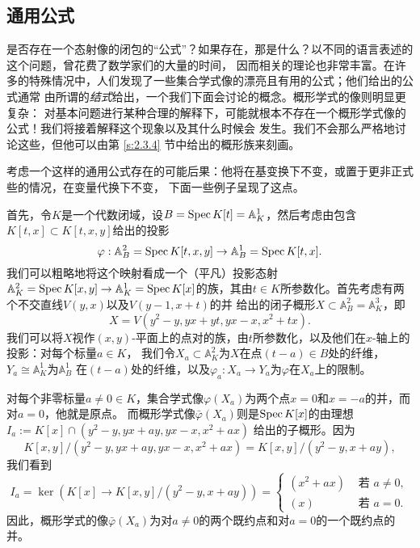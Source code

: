 \subsection{通用公式}\label{s:5.1.2}

是否存在一个态射像的闭包的“公式”？如果存在，那是什么？以不同的语言表述的这个问题，曾花费了数学家们的大量的时间，
因而相关的理论也非常丰富。在许多的特殊情况中，人们发现了一些集合学式像的漂亮且有用的公式；他们给出的公式通常
由所谓的\textit{结式}给出，一个我们下面会讨论的概念。概形学式的像则明显更复杂：
对基本问题进行某种合理的解释下，可能就根本不存在一个概形学式像的公式！我们将接着解释这个现象以及其什么时候会
发生。我们不会那么严格地讨论这些，但他可以由第 \ref{s:2.3.4} 节中给出的概形族来刻画。

考虑一个这样的通用公式存在的可能后果：他将在基变换下不变，或置于更非正式些的情况，在变量代换下不变，
下面一些例子呈现了这点。

\begin{exa}\label{exa:5.6}
    首先，令$K$是一个代数闭域，设$B=\operatorname{Spec} K[t]=\mathbb A_K^1$，然后考虑由包含$K[t,x]\subset K[t,x,y]$给出的投影
    \[
        \varphi: \mathbb{A}_B^2=\operatorname{Spec} K[t, x, y] \rightarrow \mathbb{A}_B^1=\operatorname{Spec} K[t, x].
    \]
    我们可以粗略地将这个映射看成一个（平凡）投影态射$\mathbb{A}_K^2=\operatorname{Spec} K[x, y] \rightarrow 
    \mathbb{A}_K^1=\operatorname{Spec} K[x]$的族，其由$t\in K$所参数化。首先考虑有两个不交直线$V(y,x)$以及$V(y-1,x+t)$的并
    给出的闭子概形$X \subset \mathbb{A}_B^2=\mathbb{A}_K^3$，即
    \[
        X=V\left(y^2-y, y x+y t, y x-x, x^2+t x\right).
    \]
    我们可以将$X$视作$(x,y)$-平面上的点对的族，由$t$所参数化，以及他们在$x$-轴上的投影：对每个标量$a\in K$，
    我们令$X_a\subset \mathbb A_K^2$为$X$在点$(t-a)\in B$处的纤维，$Y_a\cong \mathbb A_K^1$为$\mathbb A_B^1$
    在$(t-a)$处的纤维，以及$\varphi_a:X_a\to Y_a$为$\varphi$在$X_a$上的限制。

    对每个非零标量$a\neq 0\in K$，集合学式像$\varphi(X_a)$为两个点$x=0$和$x=-a$的并，而对$a=0$，他就是原点。
    而概形学式像$\bar\varphi(X_a)$则是$\operatorname{Spec} K[x]$的由理想$I_a:=K[x] \cap\left(y^2-y, y x+a y, y x-x, x^2+a x\right)$
    给出的子概形。因为
    \[
        K[x, y] /\left(y^2-y, y x+a y, y x-x, x^2+a x\right)=K[x, y] /\left(y^2-y, x+a y\right),
    \]%
    我们看到
    \[
        I_a=\ker\left(K[x] \rightarrow K[x, y] /\left(y^2-y, x+a y\right)\right)= 
        \begin{cases}
            (x^2+a x) & \text{ 若 } a \neq 0, \\
            (x) & \text{ 若 } a=0.
        \end{cases}
    \]
    因此，概形学式的像$\bar\varphi(X_a)$为对$a\neq 0$的两个既约点和对$a=0$的一个既约点的并。
\end{exa}

